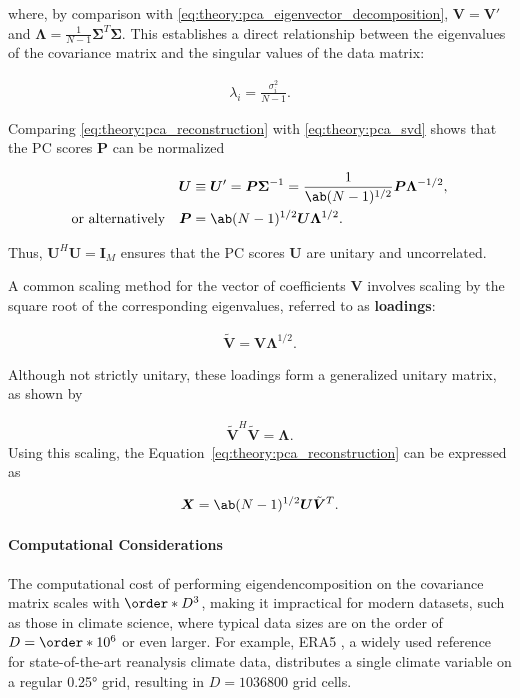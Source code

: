 where, by comparison with \eqref{eq:theory:pca_eigenvector_decomposition}, $\bm{V} = \bm{V}'$ and $\bm{\Lambda} = \frac{1}{N-1} \bm{\Sigma}^T \bm{\Sigma}$. This establishes a direct relationship between the eigenvalues of the covariance matrix and the singular values of the data matrix:

\begin{align}
    \lambda_i = \frac{ \sigma_i^2}{N-1}.
\end{align}

Comparing \eqref{eq:theory:pca_reconstruction} with \eqref{eq:theory:pca_svd} shows that the PC scores $\bm{P}$ can be normalized

\begin{align}
    \bm{U} &\equiv \bm{U}'= \bm{P} \bm{\Sigma}^{-1} = \frac{1}{\ab(N-1)^{1/2}} \bm{P} \bm{\Lambda}^{-1/2}, \nonumber \\
    \text{or alternatively} \quad \bm{P} &= \ab(N-1)^{1/2} \bm{U} \bm{\Lambda}^{1/2}.
\end{align}

Thus, $\bm{U}^H\bm{U} = \bm{I}_M$ ensures that the PC scores $\bm{U}$ are unitary and uncorrelated.

A common scaling method for the vector of coefficients $\bm{V}$ involves scaling by the square root of the corresponding eigenvalues, referred to as \textbf{loadings}:

\begin{align}
    \tilde{\bm{V}} = \bm{V} \bm{\Lambda}^{1/2}.
\end{align}

Although not strictly unitary, these loadings form a generalized unitary matrix, as shown by

\begin{align}\label{eq:theory:pca_loadings_non_orthogonal}
    \tilde{\bm{V}}^H \tilde{\bm{V}} = \bm{\Lambda}.
\end{align}
Using this scaling, the Equation~\ref{eq:theory:pca_reconstruction} can be expressed as

\begin{align}\label{eq:theory:pca_reconstruction_loadings}
    \bm{X} = \ab(N-1)^{1/2} \bm{U} \tilde{\bm{V}}^T.
\end{align}


\paragraph{Computational Considerations}

The computational cost of performing eigendencomposition on the covariance matrix scales with $\order*{D^3}$, making it impractical for modern datasets, such as those in climate science, where typical data sizes are on the order of $D=\order*{10^6}$ or even larger. For example, ERA5 \cite{c3s_era5_2018}, a widely used reference for state-of-the-art reanalysis climate data, distributes a single climate variable on a regular \ang{0.25} grid, resulting in $D=\num{1036800}$ grid cells.

